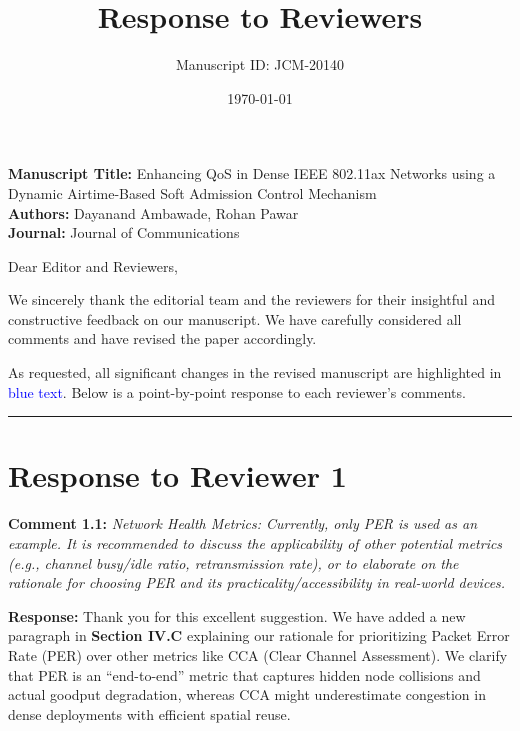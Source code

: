 \documentclass[11pt]{article}
\title{\textbf{Response to Reviewers}}
\author{Manuscript ID: JCM-20140}
\date{\today}
\begin{document}
\maketitle

\noindent \textbf{Manuscript Title:} Enhancing QoS in Dense IEEE 802.11ax Networks using a Dynamic Airtime-Based Soft Admission Control Mechanism \\
\textbf{Authors:} Dayanand Ambawade, Rohan Pawar \\
\textbf{Journal:} Journal of Communications

\vspace{0.5cm}

\noindent Dear Editor and Reviewers,

\vspace{0.3cm}

We sincerely thank the editorial team and the reviewers for their insightful and constructive feedback on our manuscript. We have carefully considered all comments and have revised the paper accordingly.

\noindent As requested, all significant changes in the revised manuscript are highlighted in \textcolor{blue}{blue text}. Below is a point-by-point response to each reviewer's comments.

\vspace{0.5cm}
\hrule
\vspace{0.5cm}

\section*{Response to Reviewer 1}

\noindent \textbf{Comment 1.1:} \textit{Network Health Metrics: Currently, only PER is used as an example. It is recommended to discuss the applicability of other potential metrics (e.g., channel busy/idle ratio, retransmission rate), or to elaborate on the rationale for choosing PER and its practicality/accessibility in real-world devices.}

\noindent \textbf{Response:} Thank you for this excellent suggestion. We have added a new paragraph in \textbf{Section IV.C} explaining our rationale for prioritizing Packet Error Rate (PER) over other metrics like CCA (Clear Channel Assessment). We clarify that PER is an ``end-to-end'' metric that captures hidden node collisions and actual goodput degradation, whereas CCA might underestimate congestion in dense deployments with efficient spatial reuse.

\vspace{0.3cm}
\end{document}
